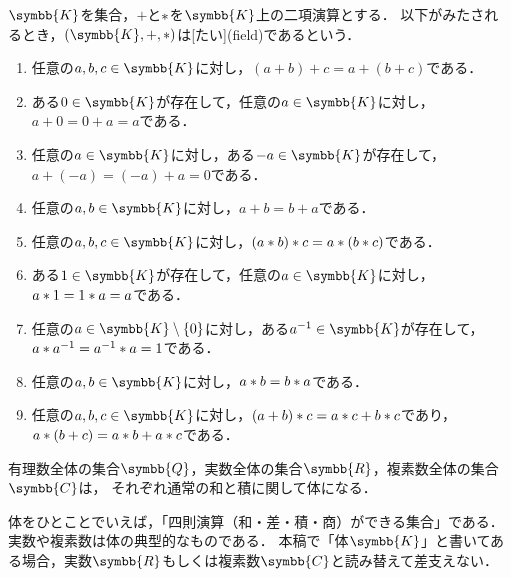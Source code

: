 \documentclass[../sotsu.tex]{subfiles}
\begin{document}
\begin{definition}[体]
    \label{dfn:field}
    $\symbb{K}$を集合，$+$と$\mathbin{\ast}$を$\symbb{K}$上の二項演算とする．
    以下がみたされるとき，$(\symbb{K}, +, \dotprod)$は[たい](field)であるという．
    \begin{enumerate}
        \item \label{field:sum-associative} 任意の$a, b, c \in \symbb{K}$に対し，$(a + b) + c = a + (b + c)$である．
        \item \label{field:sum-zero} ある$0 \in \symbb{K}$が存在して，任意の$a \in \symbb{K}$に対し，$a + 0 = 0 + a = a$である．
        \item \label{field:sum-opposite} 任意の$a \in \symbb{K}$に対し，ある$-a \in \symbb{K}$が存在して，$a + (-a) = (-a) + a = 0$である．
        \item \label{field:sum-commutative} 任意の$a, b \in \symbb{K}$に対し，$a + b = b + a$である．
        \item \label{field:prod-associative} 任意の$a, b, c \in \symbb{K}$に対し，$(a \mathbin{\ast} b) \mathbin{\ast} c = a \mathbin{\ast} (b \mathbin{\ast} c)$である．
        \item \label{field:prod-one} ある$1 \in \symbb{K}$が存在して，任意の$a \in \symbb{K}$に対し，$a \mathbin{\ast} 1 = 1 \mathbin{\ast} a = a$である．
        \item \label{field:prod-reciprocal} 任意の$a \in \symbb{K} \setminus \{0\}$に対し，ある$a^{-1} \in \symbb{K}$が存在して，$a \mathbin{\ast} a^{-1} = a^{-1} \mathbin{\ast} a = 1$である．
        \item \label{field:prod-commutative} 任意の$a, b \in \symbb{K}$に対し，$a \mathbin{\ast} b = b \mathbin{\ast} a$である．
        \item \label{field:distributive} 任意の$a, b, c \in \symbb{K}$に対し，$(a + b) \mathbin{\ast} c = a \mathbin{\ast} c + b \mathbin{\ast} c$であり，$a \mathbin{\ast} (b + c) = a \mathbin{\ast} b + a \mathbin{\ast} c$である．
    \end{enumerate}
\end{definition}

\begin{example}
    有理数全体の集合$\symbb{Q}$，実数全体の集合$\symbb{R}$，複素数全体の集合$\symbb{C}$は，
    それぞれ通常の和と積に関して体になる．
\end{example}

体をひとことでいえば，「四則演算（和・差・積・商）ができる集合」である．
実数や複素数は体の典型的なものである．
本稿で「体$\symbb{K}$」と書いてある場合，実数$\symbb{R}$もしくは複素数$\symbb{C}$と読み替えて差支えない．
\end{document}
